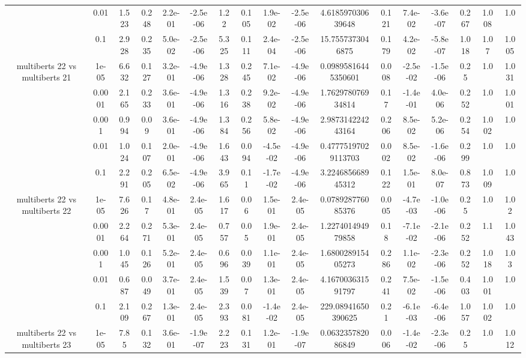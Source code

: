 \begin{tabular}{|c|c|c|c|c|c|c|c|c|c|c|c|c|c|c|c|c|}
 & 0.01 & 1.523 & 0.248 & 2.2e-01 & -2.5e-06 & 1.22 & 0.105 & 1.9e-02 & -2.5e-06 & 4.618597030639648 & 0.121 & 7.4e-02 & -3.6e-07 & 0.267 & 1.008 & 1.0 \\
 & 0.1 & 2.928 & 0.235 & 5.0e-02 & -2.5e-06 & 5.325 & 0.111 & 2.4e-04 & -2.5e-06 & 15.7557373046875 & 0.179 & 4.2e-02 & -5.8e-07 & 1.018 & 1.07 & 1.005 \\
\hline
\multirow{5}{*}{multiberts 22 vs multiberts 21} & 1e-05 & 6.632 & 0.127 & 3.2e-01 & -4.9e-06 & 1.328 & 0.245 & 7.1e-02 & -4.9e-06 & 0.09895816445350601 & 0.008 & -2.5e-02 & -1.5e-06 & 0.25 & 1.0 & 1.031 \\
 & 0.0001 & 2.165 & 0.233 & 3.6e-01 & -4.9e-06 & 1.316 & 0.238 & 9.2e-02 & -4.9e-06 & 1.762978076934814 & 0.17 & -1.4e-01 & 4.0e-06 & 0.252 & 1.0 & 1.001 \\
 & 0.001 & 0.994 & 0.09 & 3.6e-01 & -4.9e-06 & 1.384 & 0.256 & 5.8e-02 & -4.9e-06 & 2.987314224243164 & 0.206 & 8.5e-02 & 5.2e-06 & 0.254 & 1.002 & 1.0 \\
 & 0.01 & 1.024 & 0.107 & 2.0e-01 & -4.9e-06 & 1.643 & 0.094 & -4.5e-02 & -4.9e-06 & 0.47775197029113703 & 0.002 & 8.5e-02 & -1.6e-06 & 0.299 & 1.0 & 1.0 \\
 & 0.1 & 2.291 & 0.205 & 6.5e-02 & -4.9e-06 & 3.965 & 0.11 & -1.7e-02 & -4.9e-06 & 3.224685668945312 & 0.122 & 1.5e-01 & 8.0e-07 & 0.873 & 1.009 & 1.0 \\
\hline
\multirow{5}{*}{multiberts 22 vs multiberts 22} & 1e-05 & 7.626 & 0.17 & 4.8e-01 & 2.4e-05 & 1.617 & 0.06 & 1.5e-01 & 2.4e-05 & 0.078928776085376 & 0.005 & -4.7e-03 & -1.0e-06 & 0.25 & 1.0 & 1.02 \\
 & 0.0001 & 2.264 & 0.271 & 5.3e-01 & 2.4e-05 & 0.757 & 0.05 & 1.9e-01 & 2.4e-05 & 1.227401494979858 & 0.18 & -7.1e-02 & -2.1e-06 & 0.252 & 1.1 & 1.043 \\
 & 0.001 & 1.045 & 0.126 & 5.2e-01 & 2.4e-05 & 0.696 & 0.039 & 1.1e-01 & 2.4e-05 & 1.680028915405273 & 0.286 & 1.1e-02 & -2.3e-06 & 0.252 & 1.018 & 1.03 \\
 & 0.01 & 0.687 & 0.049 & 3.7e-01 & 2.4e-05 & 1.539 & 0.07 & 1.3e-01 & 2.4e-05 & 4.167003631591797 & 0.241 & 7.5e-02 & -1.5e-06 & 0.403 & 1.001 & 1.0 \\
 & 0.1 & 2.109 & 0.267 & 1.3e-01 & 2.4e-05 & 2.393 & 0.081 & -1.4e-02 & 2.4e-05 & 229.08941650390625 & 0.21 & -6.1e-03 & -6.4e-06 & 1.057 & 1.002 & 1.0 \\
\hline
\multirow{5}{*}{multiberts 22 vs multiberts 23} & 1e-05 & 7.85 & 0.132 & 3.6e-01 & -1.9e-07 & 2.223 & 0.131 & 1.2e-01 & -1.9e-07 & 0.063235782086849 & 0.006 & -1.4e-02 & -2.3e-06 & 0.25 & 1.0 & 1.012 \\

\end{tabular}

